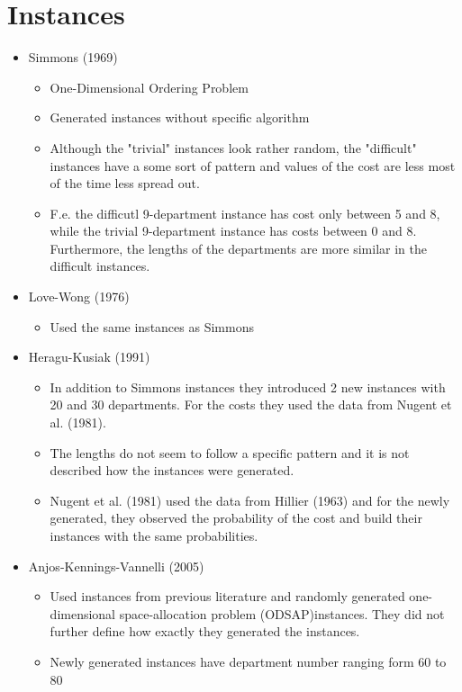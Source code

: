 \documentclass[a4paper]{article}
\begin{document}
\section*{Instances}
\begin{itemize}
    \item Simmons (1969)
    \begin{itemize}
        \item One-Dimensional Ordering Problem
        \item Generated instances without specific algorithm
        \item Although the "trivial" instances look rather random, the "difficult" instances have a some sort of pattern and values of the cost are less most of the time less spread out.
        \item F.e. the difficutl 9-department instance has cost only between 5 and 8, while the trivial 9-department instance has costs between 0 and 8. Furthermore, the lengths of the departments are more similar in the difficult instances.
    \end{itemize}
    \item Love-Wong (1976)
    \begin{itemize}
        \item Used the same instances as Simmons
    \end{itemize}
    \item Heragu-Kusiak (1991)
    \begin{itemize}
        \item In addition to Simmons instances they introduced 2 new instances with 20 and 30 departments. For the costs they used the data from Nugent et al. (1981). 
        \item The lengths do not seem to follow a specific pattern and it is not described how the instances were generated.
        \item Nugent et al. (1981) used the data from Hillier (1963) and for the newly generated, they observed the probability of the cost and build their instances with the same probabilities. 
    \end{itemize}
    \item Anjos-Kennings-Vannelli (2005)
    \begin{itemize}
        \item Used instances from previous literature and randomly generated one-dimensional space-allocation problem (ODSAP)instances. They did not further define how exactly they generated the instances.
        \item Newly generated instances have department number ranging form 60 to 80

\end{itemize}
\end{itemize}
\end{document}
